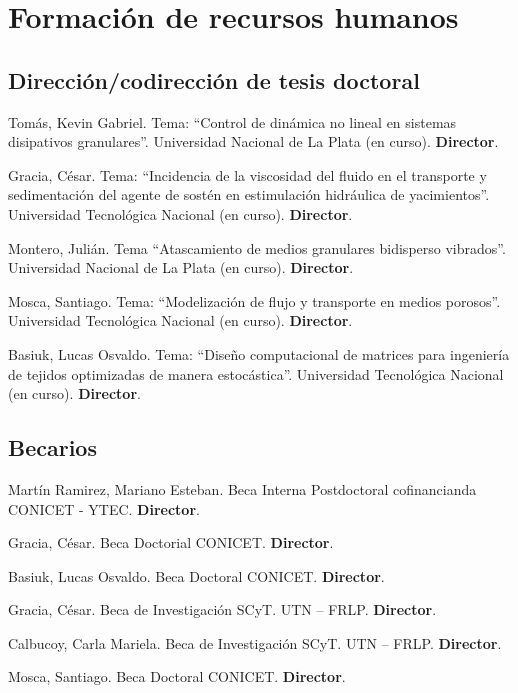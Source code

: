\section{Formación de recursos humanos}

\subsection{Dirección/codirección de tesis doctoral}

 Tomás, Kevin Gabriel. Tema: ``Control de dinámica no lineal en sistemas disipativos granulares''. Universidad Nacional de La Plata (en curso). \textbf{Director}.

 Gracia, César. Tema: ``Incidencia de la viscosidad del fluido en el transporte y sedimentación del agente de sostén en estimulación hidráulica de yacimientos''. Universidad Tecnológica Nacional (en curso). \textbf{Director}.

 Montero, Julián. Tema ``Atascamiento de medios granulares bidisperso vibrados''. Universidad Nacional de La Plata (en curso). \textbf{Director}.

 Mosca, Santiago. Tema: ``Modelización de flujo y transporte en medios porosos''. Universidad Tecnológica Nacional (en curso). \textbf{Director}.

 Basiuk, Lucas Osvaldo. Tema: ``Diseño computacional de matrices para ingeniería de tejidos optimizadas de manera estocástica''. Universidad Tecnológica Nacional  (en curso). \textbf{Director}.

\subsection{Becarios}
     Martín Ramirez, Mariano Esteban. Beca Interna Postdoctoral cofinancianda CONICET - YTEC. \textbf{Director}.

     Gracia, César. Beca Doctorial CONICET. \textbf{Director}.

     Basiuk, Lucas Osvaldo. Beca Doctoral CONICET. \textbf{Director}.

     Gracia, César. Beca de Investigación SCyT. UTN -- FRLP. \textbf{Director}.

     Calbucoy, Carla Mariela. Beca de Investigación SCyT. UTN -- FRLP. \textbf{Director}.

     Mosca, Santiago. Beca Doctoral CONICET. \textbf{Director}.

